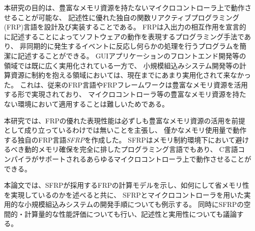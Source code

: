 本研究の目的は、豊富なメモリ資源を持たないマイクロコントローラ上で動作させることが可能な、
記述性に優れた独自の関数リアクティブプログラミング(FRP)言語を設計及び実装することである。
FRPは入出力の相互作用を宣言的に記述することによってソフトウェアの動作を表現するプログラミング手法であり、
非同期的に発生するイベントに反応し何らかの処理を行うプログラムを簡潔に記述することができる。
GUIアプリケーションのフロントエンド開発等の領域では既に広く実用化されている一方で、
小規模組込みシステム開発等の計算資源に制約を抱える領域においては、現在までにあまり実用化されて来なかった。
これは、従来のFRP言語やFRPフレームワークは豊富なメモリ資源を活用する形で実現されており、
マイクロコントローラ等の豊富なメモリ資源を持たない環境において適用することは難しいためである。

本研究では、FRPの優れた表現性能は必ずしも豊富なメモリ資源の活用を前提として成り立っているわけでは無いことを主張し、
僅かなメモリ使用量で動作する独自のFRP言語{\it SFRP}を作成した。
SFRPはメモリ制約環境下において避けるべき動的メモリ確保を完全に排したプログラミング言語でもあり、
C言語コンパイラがサポートされるあらゆるマイクロコントローラ上で動作させることができる。

本論文では、SFRPが採用するFRPの計算モデルを示し、如何にして省メモリ性を実現しているのかを述べると共に、
SFRPとマイクロコントローラを用いた実用的な小規模組込みシステムの開発手順についても例示する。
同時にSFRPの空間的・計算量的な性能評価についても行い、記述性と実用性についても議論する。

